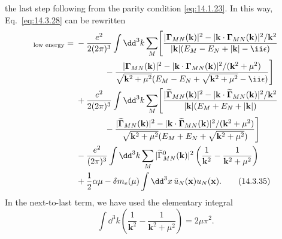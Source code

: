 the last step following from the parity condition \eqref{eq:14.1.23}. In this
way, Eq.~\eqref{eq:14.3.28} can be rewritten
\begin{align}
[\delta E_N]_{\text{low energy}}={}&
-\frac{e^2}{2(2\pi)^3}\int \dd^3k\sum_M\Biggl[
\frac{|\boldsymbol\Gamma_{MN}(\mathbf k)|^2
-|\mathbf k\cdot\boldsymbol\Gamma_{MN}(\mathbf k)|^2/\mathbf k^2}
{|\mathbf k|(E_M-E_N+|\mathbf k|-\ii\epsilon)}\notag\\
&\hspace{12mm}-
\frac{|\boldsymbol\Gamma_{MN}(\mathbf k)|^2
-|\mathbf k\cdot\boldsymbol\Gamma_{MN}(\mathbf k)|^2/(\mathbf k^2+\mu^2)}
{\sqrt{\mathbf k^2+\mu^2}
(E_M-E_N+\sqrt{\mathbf k^2+\mu^2}-\ii\epsilon)}\Biggr]\notag\\
&+\frac{e^2}{2(2\pi)^3}\int \dd^3k\sum_M\Biggl[
\frac{|\widetilde{\boldsymbol\Gamma}_{MN}(\mathbf k)|^2
-|\mathbf k\cdot\widetilde{\boldsymbol\Gamma}_{MN}(\mathbf k)|^2/\mathbf k^2}
{|\mathbf k|(E_M+E_N+|\mathbf k|)}\notag\\
&\hspace{12mm}-
\frac{|\widetilde{\boldsymbol\Gamma}_{MN}(\mathbf k)|^2
-|\mathbf k\cdot\widetilde{\boldsymbol\Gamma}_{MN}(\mathbf k)|^2/(\mathbf k^2+\mu^2)}
{\sqrt{\mathbf k^2+\mu^2}(E_M+E_N+\sqrt{\mathbf k^2+\mu^2})}
\Biggr]\notag\\
&-\frac{e^2}{(2\pi)^3}\int \dd^3k\sum_M
|\widetilde\Gamma_{MN}^0(\mathbf k)|^2
\left(\frac{1}{\mathbf k^2}-\frac{1}{\mathbf k^2+\mu^2}\right)
\notag\\
&+\frac12\alpha\mu-\delta m_e(\mu)
\int \dd^3x\,\bar u_N(\mathbf x)u_N(\mathbf x).
\tag{14.3.35}\label{eq:14.3.35}
\end{align}
In the next-to-last term, we have used the elementary integral
\[
\int \dd^3k\left(\frac{1}{\mathbf k^2}
-\frac{1}{\mathbf k^2+\mu^2}\right)=2\mu\pi^2.
\]

